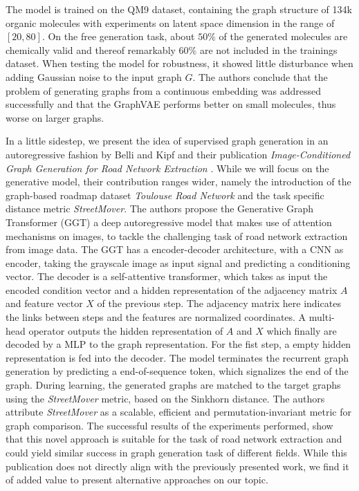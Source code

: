 The model is trained on the QM9 dataset, containing the graph structure of 134k organic molecules with experiments on latent space dimension in the range of $[20,80]$. On the free generation task, about $50\%$ of the generated molecules are chemically valid and thereof remarkably $60\%$ are not included in the trainings dataset. When testing the model for robustness, it showed little disturbance when adding Gaussian noise to the input graph $G$. The authors conclude that the problem of generating graphs
from a continuous embedding was addressed successfully and that the GraphVAE performs better on small molecules, thus worse on larger graphs.


In a little sidestep, we present the idea of supervised graph generation in an autoregressive fashion by Belli and Kipf and their publication \textit{Image-Conditioned Graph Generation for Road Network Extraction} \cite{belli_image-conditioned_2019}. While we will focus on the generative model, their contribution ranges wider, namely the introduction of the graph-based roadmap dataset \textit{Toulouse Road Network} and the task specific distance metric \textit{StreetMover}. The authors propose the Generative Graph Transformer (GGT) a deep autoregressive model that makes use of attention mechanisms on images, to tackle the challenging task of road network extraction from image data. The GGT has a encoder-decoder architecture, with a CNN as encoder, taking the grayscale image as input signal and predicting a conditioning vector. The decoder is a self-attentive transformer, which takes as input the encoded condition vector and a hidden representation of the adjacency matrix $A$ and feature vector $X$ of the previous step. The adjacency matrix here indicates the links between steps and the features are normalized coordinates. A multi-head operator outputs the hidden representation of $A$ and $X$ which finally are decoded by a MLP to the graph representation. For the fist step, a empty hidden representation is fed into the decoder. The model terminates the recurrent graph generation by predicting a end-of-sequence token, which signalizes the end of the graph. During learning, the generated graphs are matched to the target graphs using the \textit{StreetMover} metric, based on the Sinkhorn distance. The authors attribute \textit{StreetMover} as a scalable, efficient and permutation-invariant metric for graph comparison. The successful results of the experiments performed, show that this novel approach is suitable for the task of road network extraction and could yield similar success in graph generation task of different fields.
While this publication does not directly align with the previously presented work, we find it of added value to present alternative approaches on our topic.

